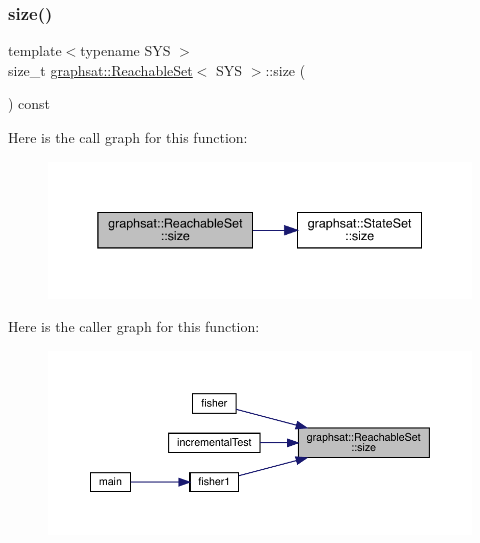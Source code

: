 \subsubsection{\texorpdfstring{size()}{size()}}
{\footnotesize\ttfamily template$<$typename S\+YS $>$ \\
size\+\_\+t \mbox{\hyperlink{classgraphsat_1_1_reachable_set}{graphsat\+::\+Reachable\+Set}}$<$ S\+YS $>$\+::size (\begin{DoxyParamCaption}{ }\end{DoxyParamCaption}) const\hspace{0.3cm}{\ttfamily [inline]}}

Here is the call graph for this function\+:
\nopagebreak
\begin{figure}[H]
\begin{center}
\leavevmode
\includegraphics[width=338pt]{classgraphsat_1_1_reachable_set_acf559d7f83f427600d8c17e4fed05a03_cgraph}
\end{center}
\end{figure}
Here is the caller graph for this function\+:
\nopagebreak
\begin{figure}[H]
\begin{center}
\leavevmode
\includegraphics[width=350pt]{classgraphsat_1_1_reachable_set_acf559d7f83f427600d8c17e4fed05a03_icgraph}
\end{center}
\end{figure}
\mbox{\label{classgraphsat_1_1_reachable_set_aa22dee8c8fb1d9cdfb52f1a86deb0a4f}} 
